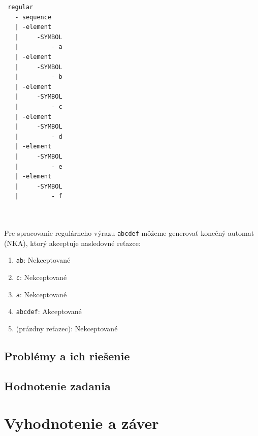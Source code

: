 \documentclass[a4paper,12pt]{article}
\begin{document}
\begin{verbatim}
 regular
   - sequence
   | -element
   |     -SYMBOL
   |         - a
   | -element
   |     -SYMBOL
   |         - b
   | -element
   |     -SYMBOL
   |         - c
   | -element
   |     -SYMBOL
   |         - d
   | -element
   |     -SYMBOL
   |         - e
   | -element
   |     -SYMBOL
   |         - f

   
    \end{verbatim}

Pre spracovanie regulárneho výrazu \texttt{abcdef} môžeme generovať konečný automat (NKA), ktorý akceptuje nasledovné reťazce:

\begin{enumerate}
    \item \texttt{ab}: Nekceptované
    \item \texttt{c}: Nekceptované
    \item \texttt{a}: Nekceptované
    \item \texttt{abcdef}: Akceptované
    \item \texttt{} (prázdny reťazec): Nekceptované
\end{enumerate}

\subsection{Problémy a ich riešenie}


\subsection{Hodnotenie zadania}


\section{Vyhodnotenie a záver}

\end{document}
